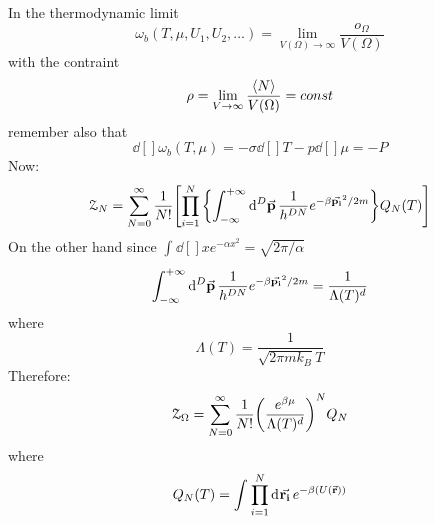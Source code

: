 \documentclass[../main/main.tex]{subfiles}
\begin{document}
In the thermodynamic limit
\begin{equation}
  \omega _ b (T, \mu , U_1, U_2, \dots) = \lim_{V (\Omega ) \rightarrow \infty } \frac{o
  _ \Omega }{V (\Omega )}
\end{equation}
with the contraint
\begin{equation}
  \rho = \lim_{V \rightarrow \infty } \frac{\expval{N} }{V (\Omega ) } = const
\end{equation}
remember also that
\begin{equation}
\dd[]{\omega _b (T, \mu )} = - \sigma \dd[]{T} - p \dd[]{\mu } = - P
\end{equation}
Now:
\begin{equation}
  \mathcal{Z}_N = \sum_{N=0}^{\infty } \frac{1}{N!} \qty[\prod_{i=1}^{N}  \qty{ \int_{-\infty }^{+ \infty } \dd[D]{\va{p}} \frac{1}{h^{DN}} e^{-\beta \va{p_i}^2/2m}  } Q_N (T) ]
\end{equation}
On the other hand since \( \int_{}^{} \dd[]{x} e^{- \alpha x^2} = \sqrt{2 \pi / \alpha }    \)
\begin{equation}
  \int_{-\infty }^{+ \infty } \dd[D]{\va{p}} \frac{1}{h^{DN}} e^{-\beta \va{p_i}^2/2m} = \frac{1}{\Lambda (T)^d}
\end{equation}
where
\begin{equation}
  \Lambda ( T) = \frac{1}{\sqrt{2 \pi m k_B} T}
\end{equation}
Therefore:
\begin{equation}
  \mathcal{Z}_ \Omega = \sum_{N=0}^{\infty } \frac{1}{N!} \qty(\frac{e^{\beta \mu } }{\Lambda (T)^d})^N Q_N
\end{equation}
where
\begin{equation}
  Q_N (T) = \int_{}^{} \prod_{i=1}^{N}  \dd[]{\va{r_i}}  e^{-\beta (U(\va{r}))}
\end{equation}
\end{document}
